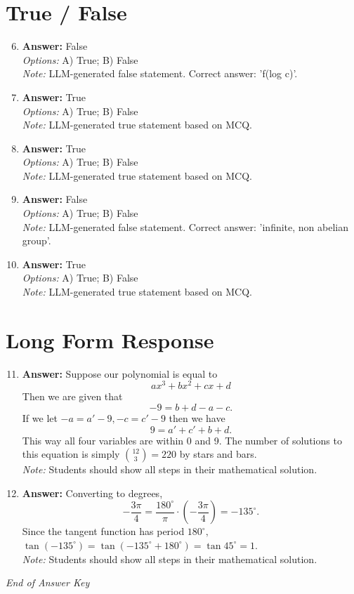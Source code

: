 \documentclass[12pt]{article}
\begin{document}
\section*{True / False}
\begin{enumerate}[label=\arabic*.]
\setcounter{enumi}{5}
\item \textbf{Answer:} False
\\ \textit{Options:} A) True; B) False
\\ \textit{Note:} LLM-generated false statement. Correct answer: 'f(log c)'.
\item \textbf{Answer:} True
\\ \textit{Options:} A) True; B) False
\\ \textit{Note:} LLM-generated true statement based on MCQ.
\item \textbf{Answer:} True
\\ \textit{Options:} A) True; B) False
\\ \textit{Note:} LLM-generated true statement based on MCQ.
\item \textbf{Answer:} False
\\ \textit{Options:} A) True; B) False
\\ \textit{Note:} LLM-generated false statement. Correct answer: 'infinite, non abelian group'.
\item \textbf{Answer:} True
\\ \textit{Options:} A) True; B) False
\\ \textit{Note:} LLM-generated true statement based on MCQ.
\end{enumerate}

\section*{Long Form Response}
\begin{enumerate}[label=\arabic*.]
\setcounter{enumi}{10}
\item \textbf{Answer:} Suppose our polynomial is equal to\[ax^3+bx^2+cx+d\]Then we are given that\[-9=b+d-a-c.\]If we let $-a=a'-9, -c=c'-9$ then we have\[9=a'+c'+b+d.\]This way all four variables are within 0 and 9. The number of solutions to this equation is simply $\binom{12}{3}=\boxed{220}$ by stars and bars.
\\ \textit{Note:} Students should show all steps in their mathematical solution.
\item \textbf{Answer:} Converting to degrees, \[-\frac{3 \pi}{4} = \frac{180^\circ}{\pi} \cdot \left( -\frac{3 \pi}{4} \right) = -135^\circ.\]Since the tangent function has period $180^\circ,$ $\tan (-135^\circ) = \tan (-135^\circ + 180^\circ) = \tan 45^\circ = \boxed{1}.$
\\ \textit{Note:} Students should show all steps in their mathematical solution.
\end{enumerate}

\vfill
\noindent\textit{End of Answer Key}
\end{document}
